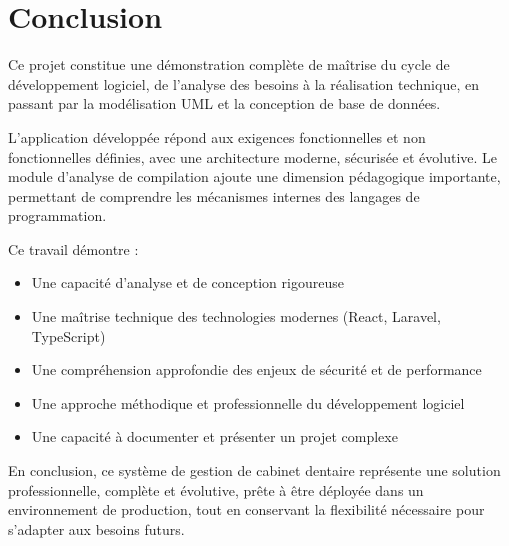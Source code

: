 \documentclass[12pt,a4paper]{report}
\begin{document}
\section{Conclusion}

Ce projet constitue une démonstration complète de maîtrise du cycle de développement logiciel, de l'analyse des besoins à la réalisation technique, en passant par la modélisation UML et la conception de base de données. 

L'application développée répond aux exigences fonctionnelles et non fonctionnelles définies, avec une architecture moderne, sécurisée et évolutive. Le module d'analyse de compilation ajoute une dimension pédagogique importante, permettant de comprendre les mécanismes internes des langages de programmation.

Ce travail démontre :
\begin{itemize}
    \item Une capacité d'analyse et de conception rigoureuse
    \item Une maîtrise technique des technologies modernes (React, Laravel, TypeScript)
    \item Une compréhension approfondie des enjeux de sécurité et de performance
    \item Une approche méthodique et professionnelle du développement logiciel
    \item Une capacité à documenter et présenter un projet complexe
\end{itemize}

En conclusion, ce système de gestion de cabinet dentaire représente une solution professionnelle, complète et évolutive, prête à être déployée dans un environnement de production, tout en conservant la flexibilité nécessaire pour s'adapter aux besoins futurs.
\end{document}
